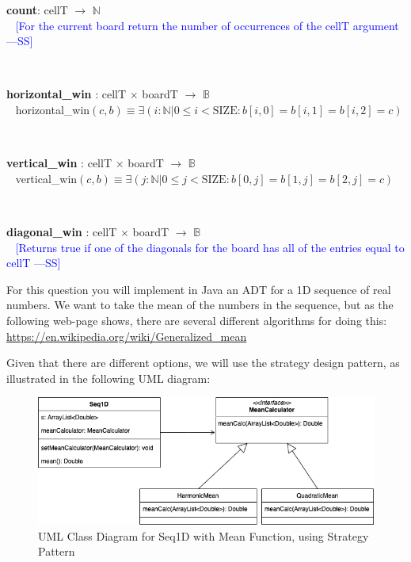 \documentclass[12pt,fleqn]{examtst}
\newcommand{\authornote}[3]{\textcolor{#1}{[#3 ---#2]}}
\newcommand{\authornote}[3]{}
\newcommand{\wss}[1]{\authornote{blue}{SS}{#1}}
\begin{document}
\noindent \textbf{count}: cellT $\rightarrow$ $\mathbb{N}$\\
~\newline
\wss{For the current board return the number of occurrences of the cellT
  argument}
~\newline


~\newline

\noindent \textbf{horizontal\_win} : cellT $\times$ boardT $\rightarrow$ $\mathbb{B}$\\
~\newline
horizontal\_win$(c, b) \equiv \exists (i : \mathbb{N} | 0 \leq i < \mbox{SIZE} : b[i, 0] = b[i, 1] = b[i, 2] = c)$

~\newline

\noindent \textbf{vertical\_win} : cellT $\times$ boardT $\rightarrow$ $\mathbb{B}$\\
~\newline
vertical\_win$(c, b) \equiv \exists (j : \mathbb{N} | 0 \leq j < \mbox{SIZE} : b[0, j] = b[1, j] = b[2, j] = c)$

~\newline

\noindent \textbf{diagonal\_win} : cellT $\times$ boardT $\rightarrow$ $\mathbb{B}$\\
~\newline
\wss{Returns true if one of the diagonals for the board has all of the entries
  equal to cellT}
~\newline



\newpage

 For this question you will implement in Java an ADT for a 1D
sequence of real numbers.  We want to take the mean of the numbers in the
sequence, but as the following web-page shows, there are several different
algorithms for doing this: \url{https://en.wikipedia.org/wiki/Generalized_mean}

Given that there are different options, we will use the strategy design pattern,
as illustrated in the following UML diagram:

\begin{figure}[!h]
\begin{center}
\includegraphics[scale=0.7]{Seq1D_Mean_Strategy_UML.png}
\end{center}
\caption{UML Class Diagram for Seq1D with Mean Function, using Strategy
  Pattern} \label{Fig_UML_Strategy}
\end{figure}
\end{document}
